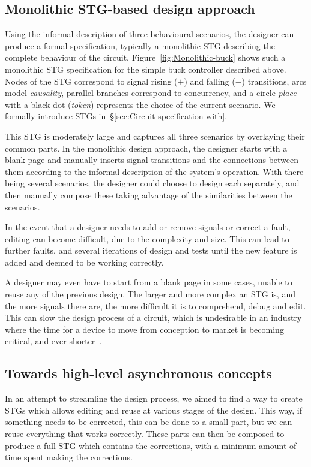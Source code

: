\documentclass[british,compsoc]{IEEEtran}
\begin{document}
\subsection{Monolithic STG-based design approach\label{sub:Monolithic}}

Using the informal description of three behavioural scenarios, the designer can
produce a formal specification, typically a monolithic STG describing the
complete behaviour of the circuit. Figure~\ref{fig:Monolithic-buck} shows such
a monolithic STG specification for the simple buck controller described above.
Nodes of the STG correspond to signal rising ($+$) and falling ($-$) transitions,
arcs model \emph{causality}, parallel branches correspond to concurrency, and
a circle \emph{place} with a black dot (\emph{token}) represents the choice of
the current scenario. We formally introduce STGs
in~\S\ref{sec:Circuit-specification-with}.

This STG is moderately large and captures all three scenarios by overlaying
their common parts. In the monolithic design approach, the designer starts with
a blank page and manually inserts signal transitions and the connections between
them according to the informal description of the system's operation. With
there being several scenarios, the designer could choose to design each
separately, and then manually compose these taking advantage of the
similarities between the scenarios.

In the event that a designer needs to add or remove signals or correct a fault, editing can become difficult, due to the complexity and size. This can lead to
further faults, and several iterations of design and tests until the new feature is added and deemed to be working correctly.

A designer may even have to start from a
blank page in some cases, unable to reuse any of the previous design. The larger and more complex an STG is, and the more signals there are, the more difficult it is to comprehend,
debug and edit. This can slow the design process of a circuit, which is undesirable in an industry where the time for a device to move from conception to market is becoming critical, and ever shorter~\cite{2014_sokolov_ftfc}\cite{sokolov2015design}.

\subsection{Towards high-level asynchronous concepts\label{sub:new-way}}
In an attempt to streamline the design process, we aimed to find a way to
create STGs which allows editing and reuse at various stages of the design.
This way, if something needs to be corrected, this can be done to a small part,
but we can reuse everything that works correctly. These parts can then be
composed to produce a full STG which contains the corrections, with a minimum
amount of time spent making the corrections.
\end{document}
